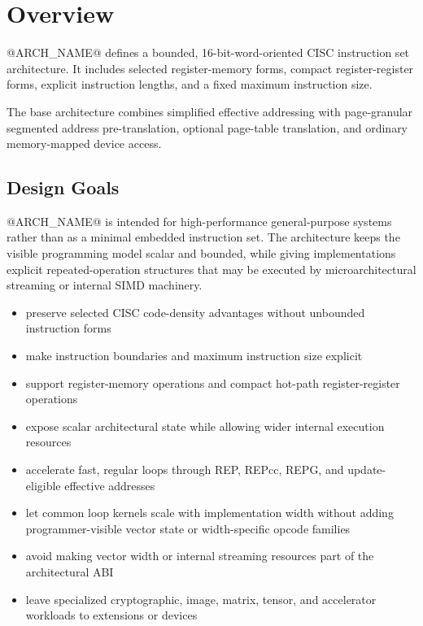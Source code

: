 \clearpage
\section{Overview}

@ARCH_NAME@ defines a bounded, 16-bit-word-oriented CISC instruction set
architecture. It includes selected register-memory forms, compact
register-register forms, explicit instruction lengths, and a fixed maximum
instruction size.

The base architecture combines simplified effective addressing with
page-granular segmented address pre-translation, optional page-table
translation, and ordinary memory-mapped device access.

\subsection{Design Goals}
@ARCH_NAME@ is intended for high-performance general-purpose systems rather
than as a minimal embedded instruction set. The architecture keeps the visible
programming model scalar and bounded, while giving implementations explicit
repeated-operation structures that may be executed by microarchitectural
streaming or internal SIMD machinery.

\begin{itemize}
\item preserve selected CISC code-density advantages without unbounded instruction forms
\item make instruction boundaries and maximum instruction size explicit
\item support register-memory operations and compact hot-path register-register operations
\item expose scalar architectural state while allowing wider internal execution resources
\item accelerate fast, regular loops through REP, REPcc, REPG, and update-eligible effective addresses
\item let common loop kernels scale with implementation width without adding programmer-visible vector state or width-specific opcode families
\item avoid making vector width or internal streaming resources part of the architectural ABI
\item leave specialized cryptographic, image, matrix, tensor, and accelerator workloads to extensions or devices
\end{itemize}

